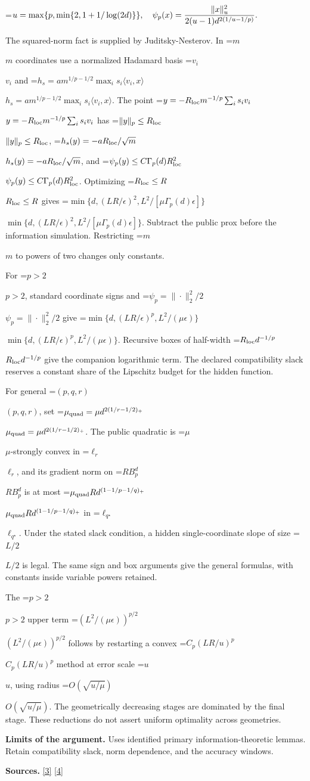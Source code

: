 \documentclass[10pt,a4paper]{article}
\newcommand{\AtlasMath}[1]{\par\begingroup\centering\setbox0=\hbox{$\displaystyle #1$}\ifdim\wd0>1.4\linewidth\typeout{ATLAS WIDE FORMULA: \the\wd0}\fi\ifdim\wd0>\linewidth\resizebox{\linewidth}{!}{\box0}\else\box0\fi\par\endgroup}
\newcommand{\AtlasInlineMath}[1]{\begingroup\setbox0=\hbox{$#1$}\ifdim\wd0>.4\linewidth\endgroup\AtlasMath{#1}\else\endgroup$#1$\fi}
\begin{document}
\AtlasMath{u=\max\{p,\min\{2,1+1/\log(2d)\}\},\quad
\psi_p(x)={\|x\|_u^2\over2(u-1)d^{2(1/u-1/p)}}.}

The squared-norm fact is supplied by Juditsky-Nesterov. In \AtlasInlineMath{m} coordinates use a normalized Hadamard basis \AtlasInlineMath{v_i} and
\AtlasInlineMath{h_s=a m^{1/p-1/2}\max_i s_i\langle v_i,x\rangle}.
The point \AtlasInlineMath{y=-R_{\rm loc}m^{-1/p}\sum_i s_iv_i} has
\AtlasInlineMath{\|y\|_p\le R_{\rm loc}}, \AtlasInlineMath{h_s(y)=-aR_{\rm loc}/\sqrt m}, and
\AtlasInlineMath{\psi_p(y)\le C\Gamma_p(d)R_{\rm loc}^2}.
Optimizing \AtlasInlineMath{R_{\rm loc}\le R} gives
\AtlasInlineMath{\min\{d,(LR/\epsilon)^2,L^2/[\mu\Gamma_p(d)\epsilon]\}}.
Subtract the public prox before the information simulation. Restricting \AtlasInlineMath{m} to powers of two changes only constants.

For \AtlasInlineMath{p>2}, standard coordinate signs and \AtlasInlineMath{\psi_p=\|\cdot\|_2^2/2} give
\AtlasInlineMath{\min\{d,(LR/\epsilon)^p,L^2/(\mu\epsilon)\}}.
Recursive boxes of half-width \AtlasInlineMath{R_{\rm loc}d^{-1/p}} give the companion logarithmic term. The declared compatibility slack reserves a constant share of the Lipschitz budget for the hidden function.

For general \AtlasInlineMath{(p,q,r)}, set \AtlasInlineMath{\mu_{\rm quad}=\mu d^{2(1/r-1/2)_+}}. The public quadratic is \AtlasInlineMath{\mu}-strongly convex in \AtlasInlineMath{\ell_r}, and its gradient norm on \AtlasInlineMath{RB_p^d} is at most
\AtlasInlineMath{\mu_{\rm quad}R d^{(1-1/p-1/q)_+}} in \AtlasInlineMath{\ell_{q^\star}}.
Under the stated slack condition, a hidden single-coordinate slope of size \AtlasInlineMath{L/2} is legal. The same sign and box arguments give the general formulas, with constants inside variable powers retained.

The \AtlasInlineMath{p>2} upper term \AtlasInlineMath{(L^2/(\mu\epsilon))^{p/2}} follows by restarting a convex \AtlasInlineMath{C_p(LR/u)^p} method at error scale \AtlasInlineMath{u}, using radius \AtlasInlineMath{O(\sqrt{u/\mu})}. The geometrically decreasing stages are dominated by the final stage. These reductions do not assert uniform optimality across geometries.

\textbf{Limits of the argument.} Uses identified primary information-theoretic lemmas. Retain compatibility slack, norm dependence, and the accuracy windows.

\textbf{Sources.} \href{https://arxiv.org/pdf/1407.5144}{[3]} \href{https://arxiv.org/pdf/1401.1792}{[4]}
\end{document}

